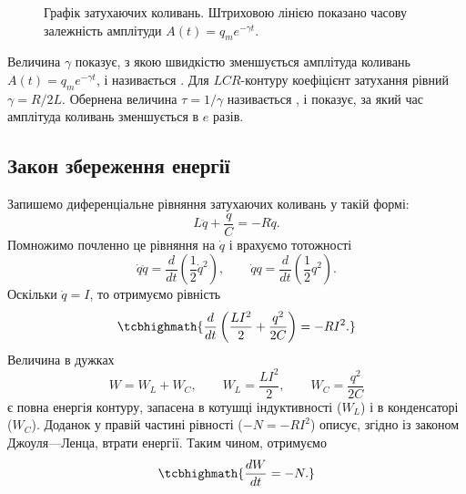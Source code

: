 \begin{figure}[h!]
	\centering
	\caption{Графік затухаючих коливань. Штриховою лінією показано часову залежність амплітуди $A(t) = q_m e^{-\gamma t}$.}
	\label{tikz:damped}
\end{figure}

Величина $\gamma$ показує, з якою швидкістю зменшується амплітуда коливань $A(t) = q_m e^{-\gamma t}$, і називається . Для $LCR$-контуру коефіцієнт затухання рівний $\gamma = R/2L$. Обернена величина $\tau = 1/\gamma$ називається , і показує, за який
час амплітуда коливань зменшується в $e$ разів.

\subsection*{Закон збереження енергії}

Запишемо диференціальне рівняння затухаючих коливань у такій формі:
\begin{equation}\label{eq:damped_equation_energy}
	L\ddot{q} + \frac{q}{C} = -R\dot{q}.
\end{equation}
Помножимо почленно це рівняння на $\dot{q}$ і врахуємо тотожності
\begin{equation}\label{eq:identities}
	\dot{q}\ddot{q} = \frac{d}{dt}\left(\frac{1}{2}\dot{q}^2\right), \qquad
	\dot{q}q = \frac{d}{dt}\left(\frac{1}{2}q^2\right).
\end{equation}
Оскільки $\dot{q} = I$, то отримуємо рівність
\begin{equation}\label{eq:energy_balance}
	\tcbhighmath{
		\frac{d}{dt}\left(\frac{LI^2}{2} + \frac{q^2}{2C}\right) = -RI^2.
	}
\end{equation}
Величина в дужках
\begin{equation}\label{eq:total_energy}
	W = W_L + W_C, \qquad W_L = \frac{LI^2}{2}, \qquad W_C = \frac{q^2}{2C}
\end{equation}
є повна енергія контуру, запасена в котушці індуктивності ($W_L$) і в конденсаторі ($W_C$). Доданок у правій частині рівності ($-N = -RI^2$) описує, згідно із законом Джоуля---Ленца, втрати енергії. Таким чином, отримуємо
\begin{equation}\label{eq:energy_loss}
	\tcbhighmath{
		\frac{dW}{dt} = -N.
	}
\end{equation}

